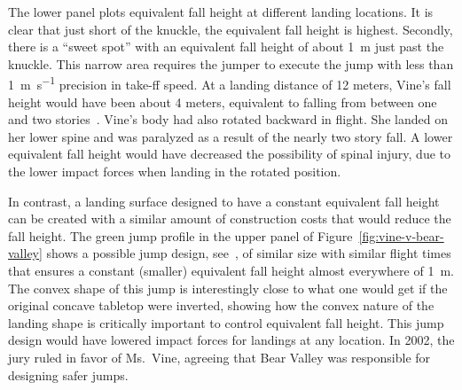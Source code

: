\documentclass{article}
\begin{document}
The lower panel plots equivalent fall height at different landing locations. It
is clear that just short of the knuckle, the equivalent fall height is highest. Secondly, there is a ``sweet spot'' with an equivalent fall height of about 1~\si{\meter} just past the knuckle. This narrow area requires the jumper to execute the jump with less than 1~\si{\meter\per\second} precision in take-ff speed.
At a landing distance of 12 meters, Vine's fall height would have been about 4
meters, equivalent to falling from between one and two stories~\cite{Vish2005}.
Vine's body had also rotated backward in flight. She landed on her lower spine
and was paralyzed as a result of the nearly two story fall. A lower equivalent
fall height would have decreased the possibility of spinal injury, due to the
lower impact forces when landing in the rotated position.


In contrast, a landing surface designed to have a constant equivalent fall
height can be created with a similar amount of construction costs that would
reduce the fall height.  The green jump profile in the upper panel of
Figure~\ref{fig:vine-v-bear-valley} shows a possible jump design, see~\cite{Levy2015}, of similar size with similar flight times that ensures a
constant (smaller) equivalent fall height almost everywhere of 1~\si{\meter}.  The convex shape
of this jump is interestingly close to what one would get if the original
concave tabletop were inverted, showing how the convex nature of the landing shape is
critically important to control equivalent fall height. This jump design
would have lowered impact forces for landings at any 
location. In 2002, the jury ruled in favor of Ms.~Vine, agreeing that
Bear Valley was responsible for designing safer jumps.
\end{document}
